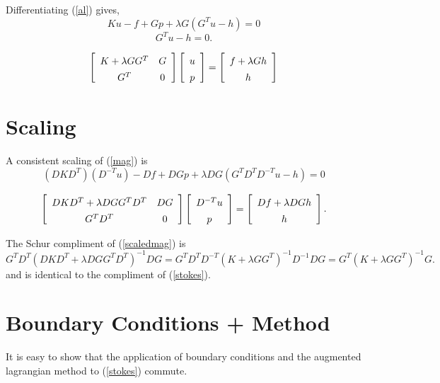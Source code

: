 \documentclass[]{svjour3}
\def\beq{\begin{equation}}
\def\eeq{\end{equation}}
\begin{document}
Differentiating (\ref{al}) gives,
\beq
   K u - f + G p + \lambda G(G^T u - h) = 0
\eeq
\beq
  G^T u -h =0.
\eeq

\beq
   \left[\begin{array}{cc}
       K + \lambda G G^T  & G \rule{0pt}{13pt}\\
       G^T & 0 \rule{0pt}{13pt}
   \end{array}\right]
   \left[
\begin{array}{c}
u  \rule{0pt}{13pt}\\
p   \rule{0pt}{13pt}
\end{array}
\right] 
=
\left[\begin{array}{c}
f + \lambda G h \rule{0pt}{13pt}\\
h   \rule{0pt}{13pt}
\end{array}
\right]
\label{mag}
\eeq

\section{Scaling}
A consistent scaling of (\ref{mag}) is
\beq
     (D K D^T)(D^{-T} u) - D f + D G p + \lambda D G(G^T D^T D^{-T} u - h) = 0
\eeq

\beq
   \left[\begin{array}{cc}
       D K D^T + \lambda D G G^T D^T  & D G \rule{0pt}{13pt}\\
       G^T D^T & 0 \rule{0pt}{13pt}
   \end{array}\right]
   \left[
   \begin{array}{c}
     D^{-T}u  \rule{0pt}{13pt}\\
     p   \rule{0pt}{13pt}
   \end{array}
   \right] 
   =
   \left[\begin{array}{c}
       D f + \lambda D G h \rule{0pt}{13pt}\\
       h   \rule{0pt}{13pt}
     \end{array}
     \right].
   \label{scaledmag}
\eeq


The Schur compliment of (\ref{scaledmag}) is
\beq
    G^T D^T (D K D^T + \lambda D G G^T D^T)^{-1} D G = G^T D^T D^{-T} (K + \lambda G G^T)^{-1} D^{-1} D G =  G^T (K + \lambda G G^T)^{-1} G.
\eeq
and is identical to the compliment of (\ref{stokes}).

\section{Boundary Conditions + Method}
It is easy to show that the application of boundary conditions and the augmented lagrangian method to (\ref{stokes})
commute.
\end{document}
